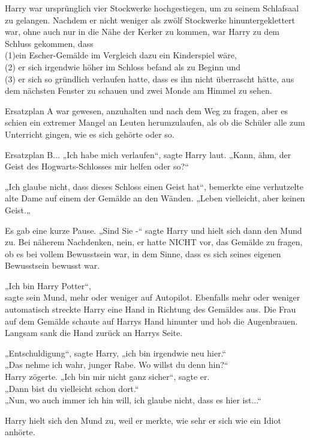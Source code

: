{Harry war ursprünglich vier Stockwerke hochgestiegen, um zu seinem Schlafsaal zu gelangen. Nachdem er nicht weniger als zwölf Stockwerke hinuntergeklettert war, ohne auch nur in die Nähe der Kerker zu kommen, war Harry zu dem Schluss gekommen, dass\\ (1)ein Escher-Gemälde im Vergleich dazu ein Kinderspiel wäre,\\ (2) er sich irgendwie höher im Schloss befand als zu Beginn und\\ (3) er sich so gründlich verlaufen hatte, dass es ihn nicht überrascht hätte, aus dem nächsten Fenster zu schauen und zwei Monde am Himmel zu sehen.

Ersatzplan A war gewesen, anzuhalten und nach dem Weg zu fragen, aber es schien ein extremer Mangel an Leuten herumzulaufen, als ob die Schüler alle zum Unterricht gingen, wie es sich gehörte oder so.

Ersatzplan B... „Ich habe mich verlaufen“, sagte Harry laut. „Kann, ähm, der Geist des Hogwarts-Schlosses mir helfen oder so?“

„Ich glaube nicht, dass dieses Schloss einen Geist hat“, bemerkte eine verhutzelte alte Dame auf einem der Gemälde an den Wänden. „Leben vielleicht, aber keinen Geist.„

Es gab eine kurze Pause. „Sind Sie -“ sagte Harry und hielt sich dann den Mund zu. Bei näherem Nachdenken, nein, er hatte NICHT vor, das Gemälde zu fragen, ob es bei vollem Bewusstsein war, in dem Sinne, dass es sich seines eigenen Bewusstsein bewusst war.

„Ich bin Harry Potter“,\\ sagte sein Mund, mehr oder weniger auf Autopilot. Ebenfalls mehr oder weniger automatisch streckte Harry eine Hand in Richtung des Gemäldes aus. Die Frau auf dem Gemälde schaute auf Harrys Hand hinunter und hob die Augenbrauen. Langsam sank die Hand zurück an Harrys Seite.

„Entschuldigung“, sagte Harry, „ich bin irgendwie neu hier.“\\ „Das nehme ich wahr, junger Rabe. Wo willst du denn hin?“\\ Harry zögerte. „Ich bin mir nicht ganz sicher“, sagte er.\\ „Dann bist du vielleicht schon dort.“\\ „Nun, wo auch immer ich hin will, ich glaube nicht, dass es hier ist...“

Harry hielt sich den Mund zu, weil er merkte, wie sehr er sich wie ein Idiot anhörte.

}
